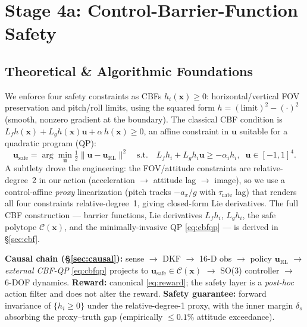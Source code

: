 \documentclass[11pt]{article}
\newcommand{\stagebox}[1]{\vspace{2pt}\noindent\colorbox{boxgray}{%
\parbox{\dimexpr\linewidth-2\fboxsep}{\small #1}}\vspace{4pt}}
\begin{document}
\section{Stage 4a: Control-Barrier-Function Safety}
\subsection{Theoretical \& Algorithmic Foundations}
We enforce four safety constraints as CBFs $h_i(\mathbf x)\!\ge\!0$:
horizontal/vertical FOV preservation and pitch/roll limits, using the
squared form $h=(\text{limit})^2-(\cdot)^2$ (smooth, nonzero gradient at the
boundary). The classical CBF condition is
$L_f h(\mathbf x)+L_g h(\mathbf x)\mathbf u+\alpha\,h(\mathbf x)\ge0$,
an affine constraint in $\mathbf u$ suitable for a quadratic program (QP):
\[
\mathbf u_\text{safe}=\arg\min_{\mathbf u}\tfrac12\lVert\mathbf u-\mathbf u_\text{RL}\rVert^2
\quad\text{s.t.}\quad L_f h_i+L_g h_i\mathbf u\ge-\alpha_i h_i,\;\;\mathbf u\in[-1,1]^4.
\]
A subtlety drove the engineering: the FOV/attitude constraints are
relative-degree~2 in our action (acceleration $\rightarrow$ attitude lag
$\rightarrow$ image), so we use a control-affine \emph{proxy} linearization
(pitch tracks $-a_x/g$ with $\tau_\text{rate}$ lag) that renders all four
constraints relative-degree~1, giving closed-form Lie derivatives. The full
CBF construction --- barrier functions, Lie derivatives $L_f h_i$, $L_g h_i$,
the safe polytope $\mathcal C(\mathbf x)$, and the minimally-invasive QP
\eqref{eq:cbfqp} --- is derived in \S\ref{sec:cbf}.

\stagebox{\textbf{Causal chain (\S\ref{sec:causal}):} sense $\rightarrow$ DKF
$\rightarrow$ 16-D obs $\rightarrow$ policy $\mathbf u_\text{RL}$ $\rightarrow$
\emph{external CBF-QP} \eqref{eq:cbfqp} projects to
$\mathbf u_\text{safe}\in\mathcal C(\mathbf x)$ $\rightarrow$ SO(3) controller
$\rightarrow$ 6-DOF dynamics. \textbf{Reward:} canonical \eqref{eq:reward};
the safety layer is a \emph{post-hoc} action filter and does not alter the
reward. \textbf{Safety guarantee:} forward invariance of
$\{h_i\ge0\}$ under the relative-degree-1 proxy, with the inner margin
$\delta_s$ absorbing the proxy--truth gap (empirically $\le0.1\%$ attitude
exceedance).}
\end{document}
